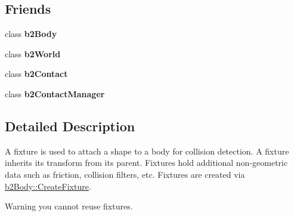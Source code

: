 \subsection*{Friends}
\begin{DoxyCompactItemize}
\item 
\hypertarget{classb2_fixture_a010ab52de250e5fe30a45d642f46405b}{class {\bfseries b2\-Body}}\label{classb2_fixture_a010ab52de250e5fe30a45d642f46405b}

\item 
\hypertarget{classb2_fixture_a4bd536c5a7c0587913765bbc2693ceea}{class {\bfseries b2\-World}}\label{classb2_fixture_a4bd536c5a7c0587913765bbc2693ceea}

\item 
\hypertarget{classb2_fixture_a6c4ac5df27ec498dd9e4281352b7a789}{class {\bfseries b2\-Contact}}\label{classb2_fixture_a6c4ac5df27ec498dd9e4281352b7a789}

\item 
\hypertarget{classb2_fixture_aece264d42f69aed410f5eb3beba6ddf2}{class {\bfseries b2\-Contact\-Manager}}\label{classb2_fixture_aece264d42f69aed410f5eb3beba6ddf2}

\end{DoxyCompactItemize}


\subsection{Detailed Description}
A fixture is used to attach a shape to a body for collision detection. A fixture inherits its transform from its parent. Fixtures hold additional non-\/geometric data such as friction, collision filters, etc. Fixtures are created via \hyperlink{classb2_body_aa4892301e9b9d62ede5e93dad1743894}{b2\-Body\-::\-Create\-Fixture}. \begin{DoxyWarning}{Warning}
you cannot reuse fixtures. 
\end{DoxyWarning}


